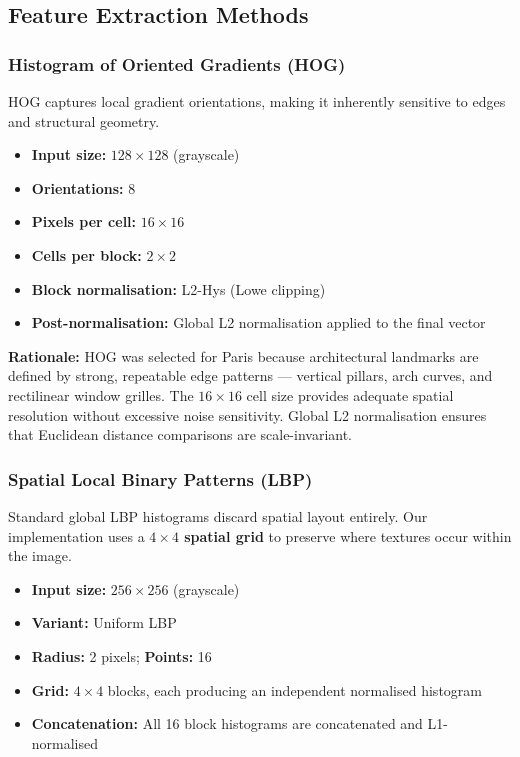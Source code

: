 \documentclass[11pt, a4paper]{article}
\begin{document}
\subsection{Feature Extraction Methods}

\subsubsection{Histogram of Oriented Gradients (HOG)}
HOG captures local gradient orientations, making it inherently sensitive to edges and structural geometry.

\begin{itemize}
  \item \textbf{Input size:} $128 \times 128$ (grayscale)
  \item \textbf{Orientations:} 8
  \item \textbf{Pixels per cell:} $16 \times 16$
  \item \textbf{Cells per block:} $2 \times 2$
  \item \textbf{Block normalisation:} L2-Hys (Lowe clipping)
  \item \textbf{Post-normalisation:} Global L2 normalisation applied to the final vector
\end{itemize}

\textbf{Rationale:} HOG was selected for Paris because architectural landmarks are defined by strong, repeatable edge patterns — vertical pillars, arch curves, and rectilinear window grilles. The $16 \times 16$ cell size provides adequate spatial resolution without excessive noise sensitivity. Global L2 normalisation ensures that Euclidean distance comparisons are scale-invariant.

\subsubsection{Spatial Local Binary Patterns (LBP)}
Standard global LBP histograms discard spatial layout entirely. Our implementation uses a \textbf{$4 \times 4$ spatial grid} to preserve where textures occur within the image.

\begin{itemize}
  \item \textbf{Input size:} $256 \times 256$ (grayscale)
  \item \textbf{Variant:} Uniform LBP
  \item \textbf{Radius:} 2 pixels; \textbf{Points:} 16
  \item \textbf{Grid:} $4 \times 4$ blocks, each producing an independent normalised histogram
  \item \textbf{Concatenation:} All 16 block histograms are concatenated and L1-normalised
\end{itemize}
\end{document}
